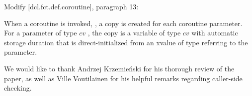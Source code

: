 Modify [dcl.fct.def.coroutine], paragraph 13:
\begin{adjustwidth}{0.5cm}{0.5cm}
When a coroutine is invoked, , a copy is created for each coroutine parameter. For a parameter of type $cv$ , the copy is a variable of type $cv$  with automatic storage duration that is direct-initialized from an xvalue of type  referring to the parameter.

\end{adjustwidth}


We would like to thank Andrzej Krzemie\' nski for his thorough review of the paper, as well as Ville Voutilainen for his helpful remarks regarding caller-side checking.


\renewcommand{\addcontentsline}[3]{}%







